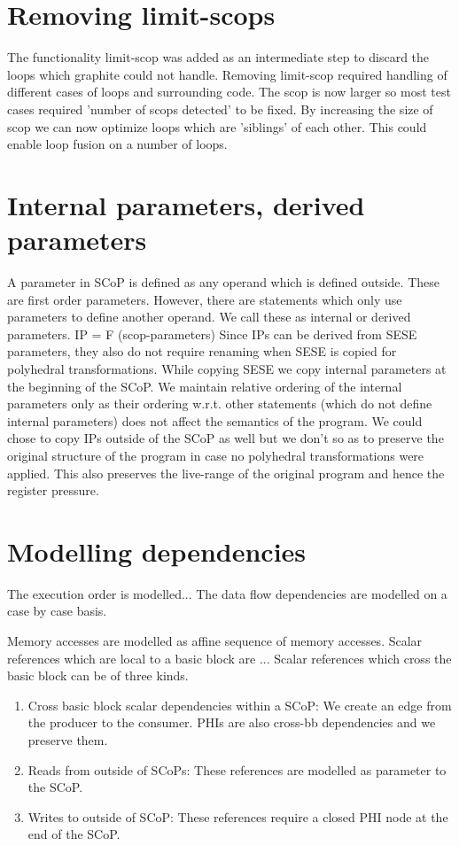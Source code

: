\documentclass{sigplanconf}
\begin{document}
\section{Removing limit-scops}
The functionality limit-scop was added
as an intermediate step to discard the loops which graphite could not
handle. Removing limit-scop required handling of different cases of loops and
surrounding code.  The scop is now larger so most test cases required 'number of
scops detected' to be fixed. By increasing the size of scop we can now optimize
loops which are 'siblings' of each other. This could enable loop fusion on a
number of loops.



\section{Internal parameters, derived parameters}
A parameter in SCoP is defined as any operand which is defined outside. These are first order parameters.
However, there are statements which only use parameters to define another operand. We call these as internal or
derived parameters.
IP = F (scop-parameters)
Since IPs can be derived from SESE parameters, they also do not require renaming when SESE is copied for polyhedral
transformations. While copying SESE we copy internal parameters at the beginning of the SCoP.
We maintain relative ordering of the internal parameters only as their ordering w.r.t. other
statements (which do not define internal parameters) does not affect the semantics of the program.
We could chose to copy IPs outside of the SCoP as well but we don't so as to preserve the original structure of the
program in case no polyhedral transformations were applied. This also preserves the live-range
of the original program and hence the register pressure.


\section{Modelling dependencies}

The execution order is modelled...
The data flow dependencies are modelled on a case by case basis.

Memory accesses are modelled as affine sequence of memory accesses.
Scalar references which are local to a basic block are ...
Scalar references which cross the basic block can be of three kinds.
\begin{enumerate}
  \item Cross basic block scalar dependencies within a SCoP: We create an edge from the producer to the consumer.
    PHIs are also cross-bb dependencies and we preserve them.
  \item Reads from outside of SCoPs: These references are modelled as parameter to the SCoP.
  \item Writes to outside of SCoP: These references require a closed PHI node at the end of the SCoP.
\end{enumerate}
\end{document}
